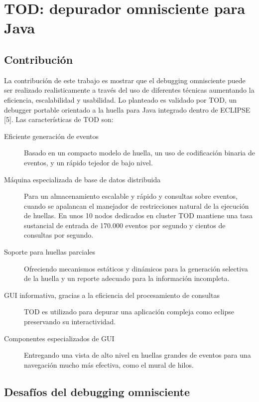 \documentclass[12pt,legalpaper]{report}
\begin{document}
	\section{TOD: depurador omnisciente para Java}
		\subsection{Contribución}

La contribución de este trabajo es mostrar que el debugging omnisciente puede ser realizado realisticamente a través del uso de diferentes técnicas aumentando la eficiencia, escalabilidad y usabilidad.  Lo planteado es validado por TOD, un debugger portable orientado a la huella para Java integrado dentro de ECLIPSE [5].  Las características de TOD son:
\begin{description}
	\item[Eficiente generación de eventos] Basado en un compacto modelo de huella, un uso de codificación binaria de eventos, y un rápido tejedor de bajo nivel.

	\item[Máquina especializada de base de datos distribuida] Para un almacenamiento escalable y rápido y consultas sobre eventos, cuando se apalancan el manejador de restricciones natural de la ejecución de huellas.  En unos 10 nodos dedicados en cluster TOD mantiene una tasa sustancial de entrada de 170.000 eventos por segundo y cientos de consultas por segundo.

	\item[Soporte para huellas parciales] Ofreciendo mecanismos estáticos y dinámicos para la generación selectiva de la huella y un reporte adecuado para la información incompleta.

	\item[GUI informativa, gracias a la eficiencia del procesamiento de consultas] TOD es utilizado para depurar una aplicación compleja como eclipse preservando su interactividad.

	\item[Componentes especializados de GUI] Entregando una vista de alto nivel en huellas grandes de eventos para una navegación mucho más efectiva, como el mural de hilos.
\end{description}


		\subsection[Desafíos]{Desafíos del debugging omnisciente}
\end{document}

